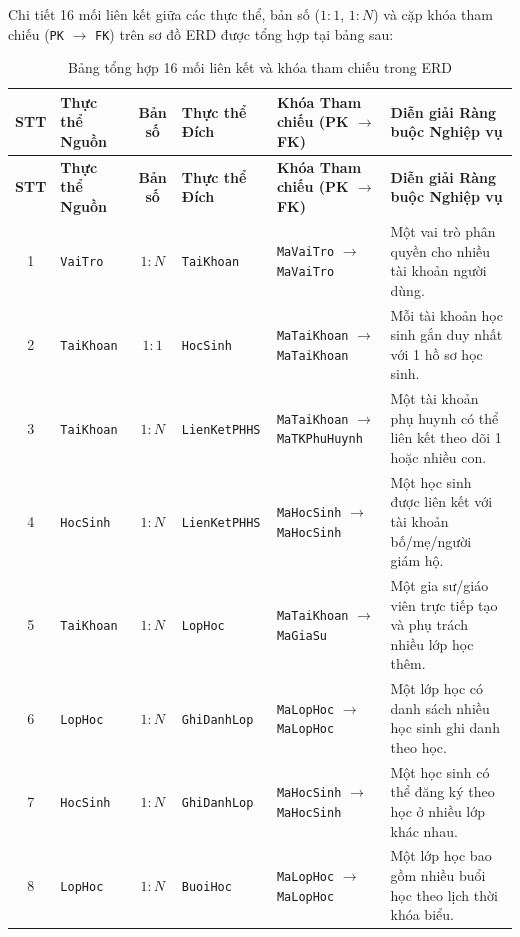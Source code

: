 \documentclass[12pt,a4paper]{article}
\begin{document}
Chi tiết 16 mối liên kết giữa các thực thể, bản số ($1:1$, $1:N$) và cặp khóa tham chiếu (\texttt{PK} $\rightarrow$ \texttt{FK}) trên sơ đồ ERD được tổng hợp tại bảng sau:

{\footnotesize
\begin{longtable}{@{}c >{\raggedright\arraybackslash}p{2.0cm} c >{\raggedright\arraybackslash}p{2.0cm} >{\raggedright\arraybackslash}p{3.6cm} >{\raggedright\arraybackslash}p{4.5cm}@{}}
\caption{Bảng tổng hợp 16 mối liên kết và khóa tham chiếu trong ERD}\\
\toprule
\textbf{STT} & \textbf{Thực thể Nguồn} & \textbf{Bản số} & \textbf{Thực thể Đích} & \textbf{Khóa Tham chiếu (PK $\rightarrow$ FK)} & \textbf{Diễn giải Ràng buộc Nghiệp vụ} \\
\midrule
\endfirsthead
\toprule
\textbf{STT} & \textbf{Thực thể Nguồn} & \textbf{Bản số} & \textbf{Thực thể Đích} & \textbf{Khóa Tham chiếu (PK $\rightarrow$ FK)} & \textbf{Diễn giải Ràng buộc Nghiệp vụ} \\
\midrule
\endhead
1 & \texttt{VaiTro} & $1 : N$ & \texttt{TaiKhoan} & \texttt{MaVaiTro} $\rightarrow$ \texttt{MaVaiTro} & Một vai trò phân quyền cho nhiều tài khoản người dùng. \\
2 & \texttt{TaiKhoan} & $1 : 1$ & \texttt{HocSinh} & \texttt{MaTaiKhoan} $\rightarrow$ \texttt{MaTaiKhoan} & Mỗi tài khoản học sinh gắn duy nhất với 1 hồ sơ học sinh. \\
3 & \texttt{TaiKhoan} & $1 : N$ & \texttt{LienKetPHHS} & \texttt{MaTaiKhoan} $\rightarrow$ \texttt{MaTKPhuHuynh} & Một tài khoản phụ huynh có thể liên kết theo dõi 1 hoặc nhiều con. \\
4 & \texttt{HocSinh} & $1 : N$ & \texttt{LienKetPHHS} & \texttt{MaHocSinh} $\rightarrow$ \texttt{MaHocSinh} & Một học sinh được liên kết với tài khoản bố/mẹ/người giám hộ. \\
5 & \texttt{TaiKhoan} & $1 : N$ & \texttt{LopHoc} & \texttt{MaTaiKhoan} $\rightarrow$ \texttt{MaGiaSu} & Một gia sư/giáo viên trực tiếp tạo và phụ trách nhiều lớp học thêm. \\
6 & \texttt{LopHoc} & $1 : N$ & \texttt{GhiDanhLop} & \texttt{MaLopHoc} $\rightarrow$ \texttt{MaLopHoc} & Một lớp học có danh sách nhiều học sinh ghi danh theo học. \\
7 & \texttt{HocSinh} & $1 : N$ & \texttt{GhiDanhLop} & \texttt{MaHocSinh} $\rightarrow$ \texttt{MaHocSinh} & Một học sinh có thể đăng ký theo học ở nhiều lớp khác nhau. \\
8 & \texttt{LopHoc} & $1 : N$ & \texttt{BuoiHoc} & \texttt{MaLopHoc} $\rightarrow$ \texttt{MaLopHoc} & Một lớp học bao gồm nhiều buổi học theo lịch thời khóa biểu. \\

\end{longtable}}
\end{document}
